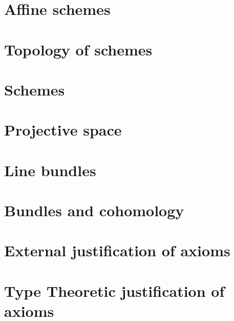 \documentclass{../util/zariski}
\begin{document}
\section{Affine schemes}


\section{Topology of schemes}


\section{Schemes}


\section{Projective space}


\section{Line bundles}


\section{Bundles and cohomology}


\section{External justification of axioms}


\section{Type Theoretic justification of axioms}



\printindex

\printbibliography
\end{document}
